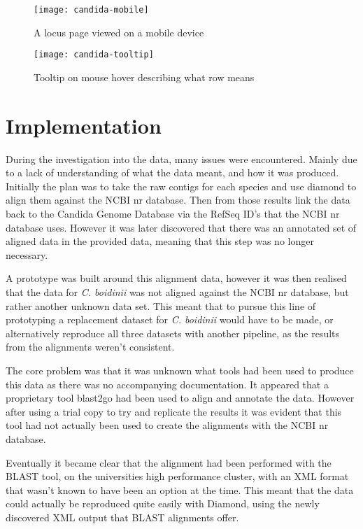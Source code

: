 \begin{figure}[H]
\begin{center}
\texttt{[image: candida-mobile]}
\caption{A locus page viewed on a mobile device}
\end{center}
\end{figure}

\begin{figure}[H]
\begin{center}
\texttt{[image: candida-tooltip]}
\caption{Tooltip on mouse hover describing what row means}
\end{center}
\end{figure}

\section{Implementation}
During the investigation into the data, many issues were encountered. Mainly due to a lack of understanding of what the data meant, and how it was produced. Initially the plan was to take the raw contigs for each species and use diamond to align them against the NCBI nr database. Then from those results link the data back to the Candida Genome Database via the RefSeq ID's that the NCBI nr database uses. However it was later discovered that there was an annotated set of aligned data in the provided data, meaning that this step was no longer necessary.

A prototype was built around this alignment data, however it was then realised that the data for \textit{C. boidinii} was not aligned against the NCBI nr database, but rather another unknown data set. This meant that to pursue this line of prototyping a replacement dataset for \textit{C. boidinii} would have to be made, or alternatively reproduce all three datasets with another pipeline, as the results from the alignments weren't consistent. 

The core problem was that it was unknown what tools had been used to produce this data as there was no accompanying documentation. It appeared that a proprietary tool blast2go\cite{blast2go} had been used to align and annotate the data. However after using a trial copy to try and replicate the results it was evident that this tool had not actually been used to create the alignments with the NCBI nr database. 

Eventually it became clear that the alignment had been performed with the BLAST tool, on the universities high performance cluster, with an XML format that wasn't known to have been an option at the time. This meant that the data could actually be reproduced quite easily with Diamond, using the newly discovered XML output that BLAST alignments offer.

